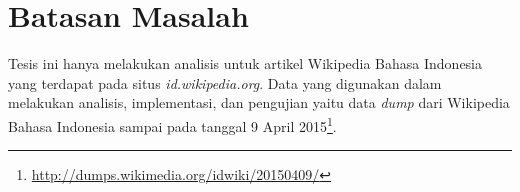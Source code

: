 \section{Batasan Masalah}\label{sec:batasan-masalah}

Tesis ini hanya melakukan analisis untuk artikel Wikipedia Bahasa Indonesia yang terdapat pada situs \textit{id.wikipedia.org}. Data yang digunakan dalam melakukan analisis, implementasi, dan pengujian yaitu data \textit{dump} dari Wikipedia Bahasa Indonesia sampai pada tanggal 9 April 2015\footnote{\url{http://dumps.wikimedia.org/idwiki/20150409/}}.